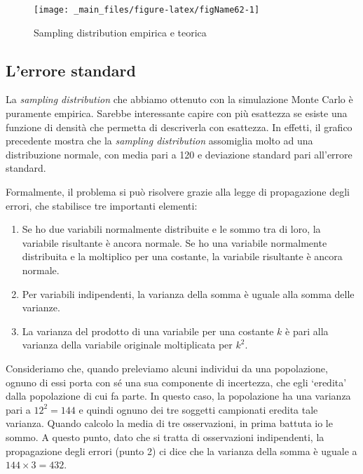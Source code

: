 \documentclass[a4paper,12pt,oneside]{book}
\providecommand{\tightlist}{%
  \setlength{\itemsep}{0pt}\setlength{\parskip}{0pt}}
\theoremstyle{definition}
\theoremstyle{definition}
\theoremstyle{definition}
\theoremstyle{remark}
\begin{document}
\begin{figure}

{\centering \texttt{[image: \_main\_files/figure-latex/figName62-1]} 

}

\caption{Sampling distribution empirica e teorica}\label{fig:figName62}
\end{figure}

\subsection{L'errore standard}\label{lerrore-standard}

La \emph{sampling distribution} che abbiamo ottenuto con la simulazione
Monte Carlo è puramente empirica. Sarebbe interessante capire con più
esattezza se esiste una funzione di densità che permetta di descriverla
con esattezza. In effetti, il grafico precedente mostra che la
\emph{sampling distribution} assomiglia molto ad una distribuzione
normale, con media pari a 120 e deviazione standard pari all'errore
standard.

Formalmente, il problema si può risolvere grazie alla legge di
propagazione degli errori, che stabilisce tre importanti elementi:

\begin{enumerate}
\def\labelenumi{\arabic{enumi}.}
\tightlist
\item
  Se ho due variabili normalmente distribuite e le sommo tra di loro, la
  variabile risultante è ancora normale. Se ho una variabile normalmente
  distribuita e la moltiplico per una costante, la variabile risultante
  è ancora normale.
\item
  Per variabili indipendenti, la varianza della somma è uguale alla
  somma delle varianze.
\item
  La varianza del prodotto di una variabile per una costante \(k\) è
  pari alla varianza della variabile originale moltiplicata per \(k^2\).
\end{enumerate}

Consideriamo che, quando preleviamo alcuni individui da una popolazione,
ognuno di essi porta con sé una sua componente di incertezza, che egli
`eredita' dalla popolazione di cui fa parte. In questo caso, la
popolazione ha una varianza pari a \(12^2 = 144\) e quindi ognuno dei
tre soggetti campionati eredita tale varianza. Quando calcolo la media
di tre osservazioni, in prima battuta io le sommo. A questo punto, dato
che si tratta di osservazioni indipendenti, la propagazione degli errori
(punto 2) ci dice che la varianza della somma è uguale a
\(144 \times 3 = 432\).
\end{document}
